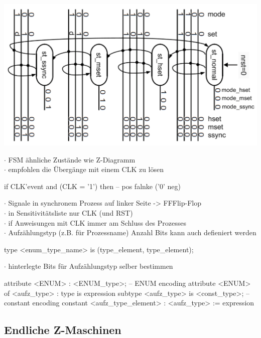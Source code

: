 \begin{minipage}{.5\textwidth}
	\includegraphics[width=\textwidth]{./bilder/ZDiagramm}
\end{minipage}
\begin{minipage}{0.02\textwidth}
	\text{ } %
\end{minipage}
\begin{minipage}{.48\textwidth}
	$\cdot$ FSM ähnliche Zustände wie Z-Diagramm\\
	$\cdot$ empfohlen die Übergänge mit einem CLK zu lösen
	\begin{VHDL}
if CLK'event and (CLK = '1') then {} -- pos falnke ('0' neg) \end{VHDL}

	$\cdot$ Signale in synchronem Prozess auf linker Seite -> FF{\tiny Flip-Flop} \\
	$\cdot$ in Sensitivitätsliste nur CLK (und RST)\\
	$\cdot$ if Anweisungen mit CLK immer am Schluss des Prozesses\\
	$\cdot$ Aufzählungstyp (z.B. für Prozessname) {\tiny  Anzahl Bits kann auch defieniert werden}
	\begin{VHDL}
type <enum_type_name> is (type_element{, type_element});	\end{VHDL}
	$\cdot$ hinterlegte Bits für Aufzählungstyp selber bestimmen
	\begin{VHDL}
attribute <ENUM> : <ENUM_type>;	-- ENUM encoding
attribute <ENUM> of	<aufz_type> : type is expression
subtype <aufz_type> is <const_type>; -- constant encoding
constant <aufz_type_element> : <aufz_type> := expression  \end{VHDL}
\end{minipage}

\subsection{Endliche Z-Maschinen}

